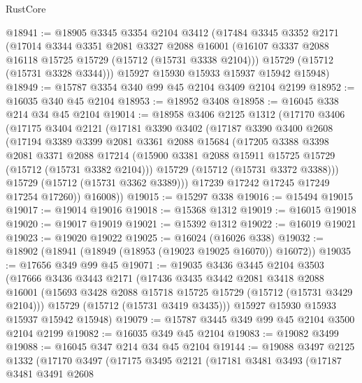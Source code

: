 \begin{lexlean}{RustCore}
\begin{coremodule}
@18941 := @18905
    @3345
    @3354
    @2104
    @3412
    (@17484
      @3345
      @3352
      @2171
      (@17014
        @3344
        @3351
        @2081
        @3327
        @2088
        @16001
        (@16107 @3337 @2088 @16118 @15725 @15729 (@15712 (@15731 @3338 @2104)))
        @15729
        (@15712 (@15731 @3328 @3344)))
      @15927
      @15930
      @15933
      @15937
      @15942
      @15948)
@18949 := @15787 @3354 @340 @99 @45 @2104 @3409 @2104 @2199
@18952 := @16035 @340 @45 @2104
@18953 := @18952 @3408
@18958 := @16045 @338 @214 @34 @45 @2104
@19014 := @18958
    @3406
    @2125
    @1312
    (@17170
      @3406
      (@17175
        @3404
        @2121
        (@17181
          @3390
          @3402
          (@17187
            @3390
            @3400
            @2608
            (@17194
              @3389
              @3399
              @2081
              @3361
              @2088
              @15684
              (@17205
                @3388
                @3398
                @2081
                @3371
                @2088
                @17214
                (@15900 @3381 @2088 @15911 @15725 @15729 (@15712 (@15731 @3382 @2104)))
                @15729
                (@15712 (@15731 @3372 @3388)))
              @15729
              (@15712 (@15731 @3362 @3389)))
            @17239
            @17242
            @17245
            @17249
            @17254
            @17260))
        @16008))
@19015 := @15297 @338
@19016 := @15494 @19015
@19017 := @19014 @19016
@19018 := @15368 @1312
@19019 := @16015 @19018
@19020 := @19017 @19019
@19021 := @15392 @1312
@19022 := @16019 @19021
@19023 := @19020 @19022
@19025 := @16024 (@16026 @338)
@19032 := @18902 (@18941 (@18949 (@18953 (@19023 @19025 @16070)) @16072))
@19035 := @17656 @349 @99 @45
@19071 := @19035
    @3436
    @3445
    @2104
    @3503
    (@17666
      @3436
      @3443
      @2171
      (@17436
        @3435
        @3442
        @2081
        @3418
        @2088
        @16001
        (@15693 @3428 @2088 @15718 @15725 @15729 (@15712 (@15731 @3429 @2104)))
        @15729
        (@15712 (@15731 @3419 @3435)))
      @15927
      @15930
      @15933
      @15937
      @15942
      @15948)
@19079 := @15787 @3445 @349 @99 @45 @2104 @3500 @2104 @2199
@19082 := @16035 @349 @45 @2104
@19083 := @19082 @3499
@19088 := @16045 @347 @214 @34 @45 @2104
@19144 := @19088
    @3497
    @2125
    @1332
    (@17170
      @3497
      (@17175
        @3495
        @2121
        (@17181
          @3481
          @3493
          (@17187
            @3481
            @3491
            @2608

\end{coremodule}
\end{lexlean}
